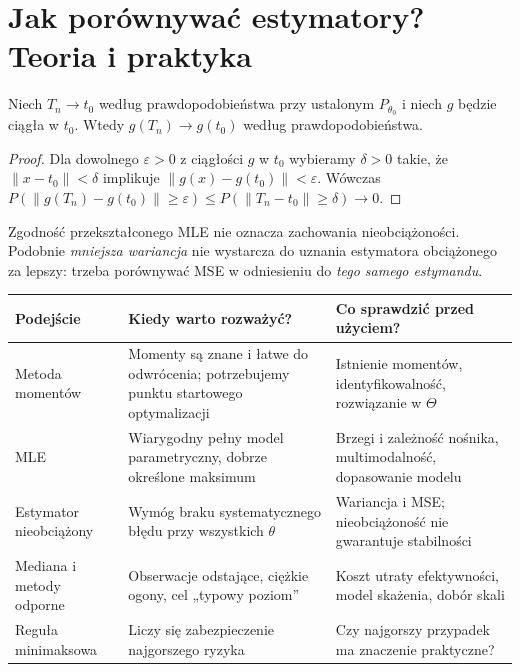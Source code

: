 \section{Jak porównywać estymatory? Teoria i praktyka}
\begin{stwierdzenie}
\label{prop:continuous-estimator}
Niech $T_n\to t_0$ według prawdopodobieństwa przy ustalonym
$P_{\theta_0}$ i niech $g$ będzie ciągła w $t_0$. Wtedy
$g(T_n)\to g(t_0)$ według prawdopodobieństwa.
\end{stwierdzenie}
\begin{proof}
Dla dowolnego $\varepsilon>0$ z ciągłości $g$ w $t_0$
wybieramy $\delta>0$ takie, że $\|x-t_0\|<\delta$
implikuje $\|g(x)-g(t_0)\|<\varepsilon$.
Wówczas
$P(\|g(T_n)-g(t_0)\|\ge\varepsilon)
\le P(\|T_n-t_0\|\ge\delta)\to0$.
\end{proof}

Zgodność przekształconego MLE nie oznacza zachowania
nieobciążoności. Podobnie \emph{mniejsza wariancja} nie wystarcza
do uznania estymatora obciążonego za lepszy: trzeba porównywać MSE
w odniesieniu do \emph{tego samego estymandu}.

\begin{center}\small
\begin{tabular}{>{\raggedright\arraybackslash}p{}>{\raggedright\arraybackslash}p{}>{\raggedright\arraybackslash}p{}}
\toprule
\textbf{Podejście} & \textbf{Kiedy warto rozważyć?} & \textbf{Co sprawdzić przed użyciem?}\\
\midrule
Metoda momentów & Momenty są znane i łatwe do odwrócenia; potrzebujemy punktu startowego optymalizacji & Istnienie momentów, identyfikowalność, rozwiązanie w $\Theta$\\
MLE & Wiarygodny pełny model parametryczny, dobrze określone maksimum & Brzegi i zależność nośnika, multimodalność, dopasowanie modelu\\
Estymator nieobciążony & Wymóg braku systematycznego błędu przy wszystkich $\theta$ & Wariancja i MSE; nieobciążoność nie gwarantuje stabilności\\
Mediana i metody odporne & Obserwacje odstające, ciężkie ogony, cel „typowy poziom” & Koszt utraty efektywności, model skażenia, dobór skali\\
Reguła minimaksowa & Liczy się zabezpieczenie najgorszego ryzyka & Czy najgorszy przypadek ma znaczenie praktyczne?\\
\bottomrule
\end{tabular}
\end{center}

